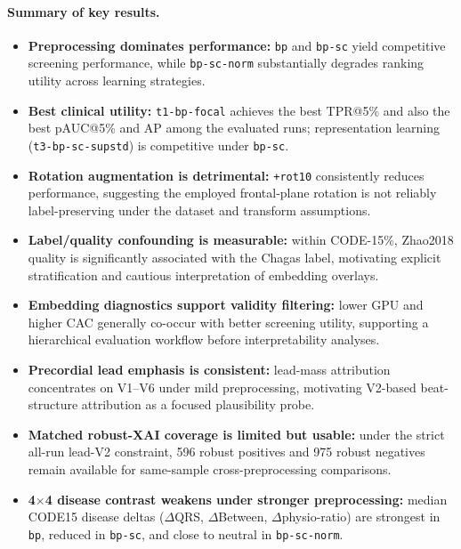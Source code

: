 \paragraph{Summary of key results.}
\begin{itemize}
  \item \textbf{Preprocessing dominates performance:} \texttt{bp} and \texttt{bp-sc} yield competitive screening performance, while \texttt{bp-sc-norm} substantially degrades ranking utility across learning strategies.
  \item \textbf{Best clinical utility:} \texttt{t1-bp-focal} achieves the best TPR@5\% and also the best pAUC@5\% and AP among the evaluated runs; representation learning (\texttt{t3-bp-sc-supstd}) is competitive under \texttt{bp-sc}.
  \item \textbf{Rotation augmentation is detrimental:} \texttt{+rot10} consistently reduces performance, suggesting the employed frontal-plane rotation is not reliably label-preserving under the dataset and transform assumptions.
  \item \textbf{Label/quality confounding is measurable:} within CODE-15\%, Zhao2018 quality is significantly associated with the Chagas label, motivating explicit stratification and cautious interpretation of embedding overlays.
  \item \textbf{Embedding diagnostics support validity filtering:} lower GPU and higher CAC generally co-occur with better screening utility, supporting a hierarchical evaluation workflow before interpretability analyses.
  \item \textbf{Precordial lead emphasis is consistent:} lead-mass attribution concentrates on V1--V6 under mild preprocessing, motivating V2-based beat-structure attribution as a focused plausibility probe.
  \item \textbf{Matched robust-XAI coverage is limited but usable:} under the strict all-run lead-V2 constraint, 596 robust positives and 975 robust negatives remain available for same-sample cross-preprocessing comparisons.
  \item \textbf{4$\times$4 disease contrast weakens under stronger preprocessing:} median CODE15 disease deltas (\(\Delta\)QRS, \(\Delta\)Between, \(\Delta\)physio-ratio) are strongest in \texttt{bp}, reduced in \texttt{bp-sc}, and close to neutral in \texttt{bp-sc-norm}.
\end{itemize}

